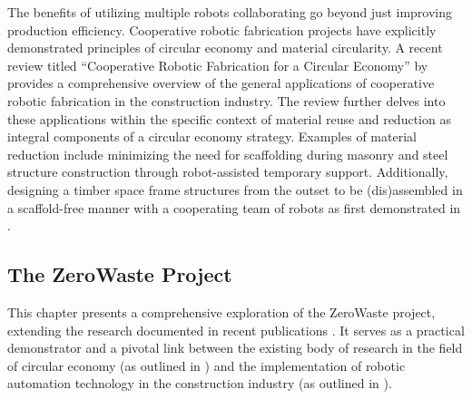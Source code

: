     The benefits of utilizing multiple robots collaborating go beyond just improving production efficiency. Cooperative robotic fabrication projects have explicitly demonstrated principles of circular economy and material circularity. A recent review titled ``Cooperative Robotic Fabrication for a Circular Economy'' by \cite{bruun_cooperative_2024} provides a comprehensive overview of the general applications of cooperative robotic fabrication in the construction industry. The review further delves into these applications within the specific context of material reuse and reduction as integral components of a circular economy strategy. Examples of material reduction include minimizing the need for scaffolding during masonry \citep{parascho_robotic_2020, parascho_lightvault_2021, han_concept_2020} and steel \citep{parascho_cooperative_2017,parascho_computational_2018} structure construction through robot-assisted temporary support. Additionally, designing a timber space frame structures from the outset to be (dis)assembled in a scaffold-free manner with a cooperating team of robots as first demonstrated in \citep{bruun_structural_2022}.



\subsection{The ZeroWaste Project} \label{sec:2c_project}
    This chapter presents a comprehensive exploration of the ZeroWaste project, extending the research documented in recent publications \citep{bruun_cooperative_2024, bruun_zerowaste_2022}. It serves as a practical demonstrator and a pivotal link between the existing body of research in the field of circular economy (as outlined in ) and the implementation of robotic automation technology in the construction industry (as outlined in ).
    
